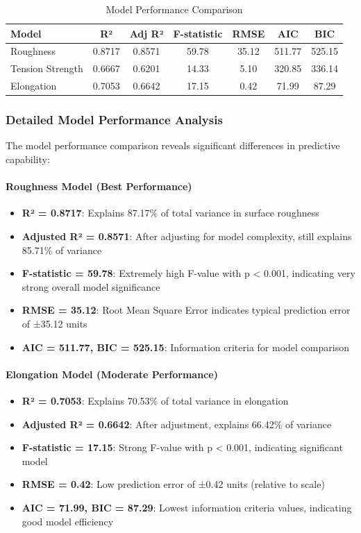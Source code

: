 \begin{table}[h]
\centering
\caption{Model Performance Comparison}
\label{tab:model_performance}
\begin{tabular}{lcccccc}
\toprule
Model & R² & Adj R² & F-statistic & RMSE & AIC & BIC \\
\midrule
Roughness & 0.8717 & 0.8571 & 59.78 & 35.12 & 511.77 & 525.15 \\
Tension Strength & 0.6667 & 0.6201 & 14.33 & 5.10 & 320.85 & 336.14 \\
Elongation & 0.7053 & 0.6642 & 17.15 & 0.42 & 71.99 & 87.29 \\
\bottomrule
\end{tabular}
\end{table}

\subsubsection{Detailed Model Performance Analysis}

The model performance comparison reveals significant differences in predictive capability:

\paragraph{Roughness Model (Best Performance)}
\begin{itemize}
    \item \textbf{R² = 0.8717}: Explains 87.17\% of total variance in surface roughness
    \item \textbf{Adjusted R² = 0.8571}: After adjusting for model complexity, still explains 85.71\% of variance
    \item \textbf{F-statistic = 59.78}: Extremely high F-value with p < 0.001, indicating very strong overall model significance
    \item \textbf{RMSE = 35.12}: Root Mean Square Error indicates typical prediction error of ±35.12 units
    \item \textbf{AIC = 511.77, BIC = 525.15}: Information criteria for model comparison
\end{itemize}

\paragraph{Elongation Model (Moderate Performance)}
\begin{itemize}
    \item \textbf{R² = 0.7053}: Explains 70.53\% of total variance in elongation
    \item \textbf{Adjusted R² = 0.6642}: After adjustment, explains 66.42\% of variance
    \item \textbf{F-statistic = 17.15}: Strong F-value with p < 0.001, indicating significant model
    \item \textbf{RMSE = 0.42}: Low prediction error of ±0.42 units (relative to scale)
    \item \textbf{AIC = 71.99, BIC = 87.29}: Lowest information criteria values, indicating good model efficiency
\end{itemize}

